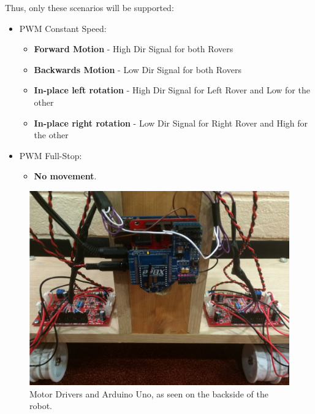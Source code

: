 \documentclass[12p,a4paper]{report}
\begin{document}
Thus, only these scenarios will be supported:
\begin{itemize}
\item PWM Constant Speed: \begin{itemize}

\item \textbf{Forward Motion} - High Dir Signal for both Rovers
\item \textbf{Backwards Motion} - Low Dir Signal for both Rovers
\item \textbf{In-place left rotation} - High Dir Signal for Left Rover and Low for the other
\item \textbf{In-place right rotation} - Low Dir Signal for Right Rover and High for the other 

\end{itemize}

\item PWM Full-Stop:
\begin{itemize}
\item \textbf{No movement}.
\end{itemize}
\end{itemize} 
\begin{figure}[H]
\begin{center}
\includegraphics[scale=0.40]{motordriver_low}
\caption{Motor Drivers and Arduino Uno, as seen on the backside of the robot.}
\label{fig:motordriver}
\end{center}
\end{figure}
\end{document}
